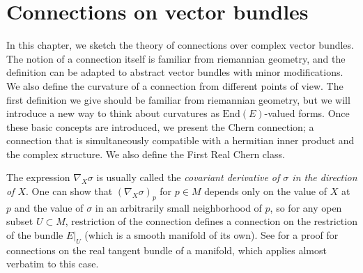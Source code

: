 \chapter{Connections on vector bundles} \label{section_connections_vector_bundles}
In this chapter, we sketch the theory of connections over complex vector bundles. The notion of a connection itself is familiar from riemannian geometry, and the definition can be adapted to abstract vector bundles with minor modifications. We also define the curvature of a connection from different points of view. The first definition we give should be familiar from riemannian geometry, but we will introduce a new way to think about curvatures as \(\mathrm{End}(E)\)-valued forms. Once these basic concepts are introduced, we present the Chern connection; a connection that is simultaneously compatible with a hermitian inner product and the complex structure. We also define the First Real Chern class.

The expression \(\nabla_X \sigma\) is usually called the \textit{covariant derivative of \(\sigma\) in the direction of \(X\)}. One can show that \((\nabla_X \sigma)_p\) for \(p \in M\) depends only on the value of \(X\) at \(p\) and the value of \(\sigma\) in an arbitrarily small neighborhood of \(p\), so for any open subset \(U \subset M\), restriction of the connection defines a connection on the restriction of the bundle \(E|_U\) (which is a smooth manifold of its own). See \parencite[Prop. 4.3]{lee_introRM} for a proof for connections on the real tangent bundle of a manifold, which applies almost verbatim to this case. \\

